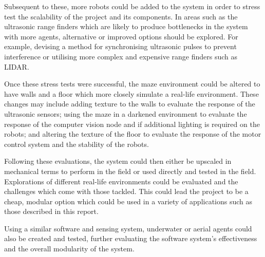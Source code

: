 Subsequent to these, more robots could be added to the system in order to 
stress test the scalability of the project and its components. In areas such as
the ultrasonic range finders which are likely to produce bottlenecks in the system
with more agents, alternative or improved options should be explored. For example,
devising a method for synchronising ultrasonic pulses to prevent interference or
utilising more complex and expensive range finders such as LIDAR. 

Once these stress tests were successful, the maze environment could be altered to
have walls and a floor which more closely simulate a real-life environment. These
changes may include adding texture to the walls to evaluate the response of the
ultrasonic sensors; using the maze in a darkened environment to evaluate the
response of the computer vision node and if additional lighting is required on the
robots; and altering the texture of the floor to evaluate the response of the
motor control system and the stability of the robots. 

Following these evaluations, the system could then either be upscaled in 
mechanical terms to perform in the field or used directly and tested in the 
field. Explorations of different real-life environments could be evaluated 
and the challenges which come with those tackled. This could lead the 
project to be a cheap, modular option which could be used in a variety of 
applications such as those described in this report. 

Using a similar software and sensing system, underwater or aerial agents 
could also be created and tested, further evaluating the software system's 
effectiveness and the overall modularity of the system. 
